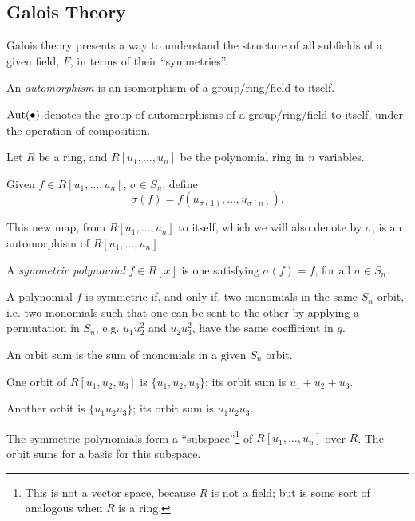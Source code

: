 \subsection{Galois Theory}

Galois theory presents a way to understand the structure of all subfields of a given field, $F$, in terms of their ``symmetries''.

\begin{defn}
	An \emph{automorphism} is an isomorphism of a group/ring/field to itself.

	$\operatorname{Aut}(\bullet)$ denotes the group of automorphisms of a group/ring/field to itself, under the operation of composition.
\end{defn}

Let $R$ be a ring, and $R[u_1, \dots, u_n]$ be the polynomial ring in $n$ variables.

Given $f \in R[u_1, \dots, u_n]$, $\sigma \in S_n$, define \[
	\sigma(f) = f(u_{\sigma(1)}, \dots, u_{\sigma(n)}).
\]

This new map, from $R[u_1, \dots, u_n]$ to itself, which we will also denote by $\sigma$, is an automorphism of  $R[u_1, \dots, u_n]$.

\begin{defn}
	A \emph{symmetric polynomial} $f \in R[x]$ is one satisfying $\sigma(f) = f$, for all $\sigma \in S_n$.
\end{defn}

\begin{prop}
	A polynomial $f$ is symmetric if, and only if, two monomials in the same $S_n$-orbit, i.e. two monomials such that one can be sent to the other by applying a permutation in $S_n$, e.g. $u_1u_2^2$ and  $u_2u_3^2$, have the same coefficient in $g$. 
\end{prop}

\begin{defn}	
	An orbit sum is the sum of monomials in a given $S_n$ orbit.
\end{defn}

\begin{exmp}
	One orbit of $R[u_1, u_2, u_3]$ is  $\{ u_1, u_2, u_3\}$; its orbit sum is $u_1 + u_2 + u_3$. 

	Another orbit is $\{u_1u_2u_3\}$; its orbit sum is $u_1u_2u_3$.
\end{exmp}

\begin{prop}
	The symmetric polynomials form a ``subspace''\footnote{This is not a vector space, because $R$ is not a field; but is some sort of analogous when $R$ is a ring.} of $R[u_1, \dots, u_n]$ over $R$. The orbit sums for a basis for this subspace.
\end{prop}


